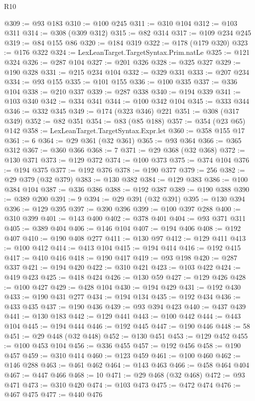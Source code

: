 \begin{lexlean}{R10}
\begin{coremodule}
@309 := @93 @183
@310 := @100 @245
@311 := @310 @104
@312 := @103 @311
@314 := @308 (@309 @312)
@315 := @82 @314
@317 := @109 @234 @245
@319 := @84 @155 @86
@320 := @184 @319
@322 := @178 (@179 @320)
@323 := @176 @322
@324 := LexLeanTarget.TargetSyntax.Prim.natLe
@325 := @121 @324
@326 := @287 @104
@327 := @201 @326
@328 := @325 @327
@329 := @190 @328
@331 := @215 @234 @104
@332 := @329 @331
@333 := @207 @234
@334 := @93 @155
@335 := @101 @155
@336 := @100 @335
@337 := @336 @104
@338 := @210 @337
@339 := @287 @338
@340 := @194 @339
@341 := @103 @340
@342 := @334 @341
@344 := @100 @342 @104
@345 := @333 @344
@346 := @332 @345
@349 := @174 (@323 @346) @221
@351 := @308 (@317 @349)
@352 := @82 @351
@354 := @83 (@85 @188)
@357 := @354 (@23 @65) @142
@358 := LexLeanTarget.TargetSyntax.Expr.let
@360 := @358 @155 @17
@361 := 6
@364 := @29 @361 (@32 @361)
@365 := @93 @364
@366 := @365 @312
@367 := @360 @366
@368 := 7
@371 := @29 @368 (@32 @368)
@372 := @130 @371
@373 := @129 @372
@374 := @100 @373
@375 := @374 @104
@376 := @194 @375
@377 := @192 @376
@378 := @190 @377
@379 := 256
@382 := @29 @379 (@32 @379)
@383 := @130 @382
@384 := @129 @383
@386 := @100 @384 @104
@387 := @336 @386
@388 := @192 @387
@389 := @190 @388
@390 := @389 @200
@391 := 9
@394 := @29 @391 (@32 @391)
@395 := @130 @394
@396 := @129 @395
@397 := @390 @396
@399 := @100 @397 @288
@400 := @310 @399
@401 := @143 @400
@402 := @378 @401
@404 := @93 @371 @311
@405 := @389 @404
@406 := @146 @104
@407 := @194 @406
@408 := @192 @407
@410 := @190 @408 @277
@411 := @130 @97
@412 := @129 @411
@413 := @100 @412
@414 := @413 @104
@415 := @194 @414
@416 := @192 @415
@417 := @410 @416
@418 := @190 @417
@419 := @93 @198
@420 := @287 @337
@421 := @194 @420
@422 := @310 @421
@423 := @103 @422
@424 := @419 @423
@425 := @418 @424
@426 := @130 @59
@427 := @129 @426
@428 := @100 @427
@429 := @428 @104
@430 := @194 @429
@431 := @192 @430
@433 := @190 @431 @277
@434 := @194 @134
@435 := @192 @434
@436 := @433 @435
@437 := @190 @436
@439 := @93 @394 @423
@440 := @437 @439
@441 := @130 @183
@442 := @129 @441
@443 := @100 @442
@444 := @443 @104
@445 := @194 @444
@446 := @192 @445
@447 := @190 @446
@448 := 58
@451 := @29 @448 (@32 @448)
@452 := @130 @451
@453 := @129 @452
@455 := @100 @453 @104
@456 := @336 @455
@457 := @192 @456
@458 := @190 @457
@459 := @310 @414
@460 := @123 @459
@461 := @100 @460
@462 := @146 @288
@463 := @461 @462
@464 := @143 @463
@466 := @458 @464 @404
@467 := @447 @466
@468 := 10
@471 := @29 @468 (@32 @468)
@472 := @93 @471
@473 := @310 @420
@474 := @103 @473
@475 := @472 @474
@476 := @467 @475
@477 := @440 @476

\end{coremodule}
\end{lexlean}
